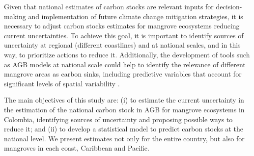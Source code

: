 \documentclass[review, authoryear]{elsarticle}   	%
\begin{document}

Given that national estimates of carbon stocks are relevant inputs for decision-making and implementation of future climate change mitigation strategies, it is necessary to adjust carbon stocks estimates for mangrove ecosystems reducing current uncertainties. To achieve this goal, it is important to identify sources of uncertainty at regional (different coastlines) and at national scales, and in this way, to prioritize actions to reduce it. Additionally, the development of tools such as AGB models at national scale could help to identify the relevance of different mangrove areas as carbon sinks, including predictive variables that account for significant levels of spatial variability \citep{Ewel1998, Kristensen2008}. %

The main objectives of this study are: (i) to estimate the current uncertainty in the estimation of the national carbon stock in AGB for mangrove ecosystems in Colombia, identifying sources of uncertainty and proposing possible ways to reduce it; and (ii) to develop a statistical model to predict carbon stocks at the national level. We present estimates not only for the entire country, but also for mangroves in each coast, Caribbean and Pacific. 

\end{document}
